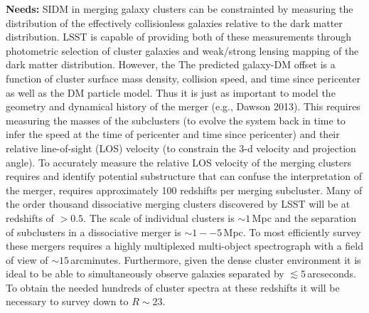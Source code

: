 {\bf Needs:} SIDM in merging galaxy clusters can be constrainted by measuring
the distribution of the effectively collisionless galaxies relative to the dark
matter distribution. LSST is capable of providing both of these measurements
through photometric selection of cluster galaxies and weak/strong lensing
mapping of the dark matter distribution. However, the The predicted galaxy-DM
offset is a function of cluster surface mass density, collision speed, and time
since pericenter as well as the DM particle model. Thus it is just as important
to model the geometry and dynamical history of the merger (e.g., Dawson 2013).
This requires measuring the masses of the subclusters (to evolve the system back
in time to infer the speed at the time of pericenter and time since pericenter)
and their relative line-of-sight (LOS) velocity (to constrain the 3-d velocity
and projection angle). To accurately measure the relative LOS velocity of the
merging clusters requires and identify potential substructure that can confuse
the interpretation of the merger, requires approximately 100 redshifts per
merging subcluster. Many of the order thousand dissociative merging clusters
discovered by LSST will be at redshifts of $>0.5$. The scale of individual
clusters is $\sim 1$\,Mpc and the separation of subclusters in a dissociative
merger is $\sim 1--5$\,Mpc. To most efficiently survey these mergers requires a
highly multiplexed multi-object spectrograph with a field of view of $\sim
15$\,arcminutes. Furthermore, given the dense cluster environment it is ideal to
be able to simultaneously observe galaxies separated by $\lesssim
5$\,arcseconds. To obtain the needed hundreds of cluster spectra at these
redshifts it will be necessary to survey down to $R\sim23$.

